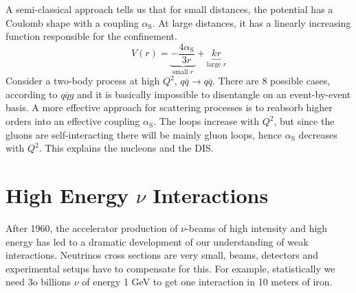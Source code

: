 \documentclass[10.75pt,a4paper,openright,bottom=2cm]{article}
\begin{document}
A semi-classical approach tells us that for small distances, the potential has a Coulomb shape with a coupling $\alpha_{\text{S}}$. At large distances, it has a linearly increasing function responsible for the confinement.
\[
V(r)=\underbrace{-\frac{4\alpha_{\text{S}}}{3r}}_{\text{small $r$}}+\underbrace{kr}_{\text{large $r$}}
\]
Consider a two-body process at high $Q^2$, $q\overline{q}\to q\overline{q}$. There are 8 possible cases, according to $q\overline{q}g$ and it is basically impossible to disentangle on an event-by-event basis. A more effective approach for scattering processes is to reabsorb higher orders into an effective coupling $\alpha_{\text{S}}$. The loops increase with $Q^2$, but since the gluons are self-interacting there will be mainly gluon loops, hence $\alpha_{\text{S}}$ decreases with $Q^2$. This explains the nucleons and the DIS.
\section{High Energy $\nu$ Interactions}
After 1960, the accelerator production of $\nu$-beams of high intensity and high energy has led to a dramatic development of our understanding of weak interactions. Neutrinos cross sections are very small, beams, detectors and experimental setups have to compensate for this. For example, statistically we need 3o billions $\nu$ of energy 1 GeV to get one interaction in 10 meters of iron.
\end{document}

